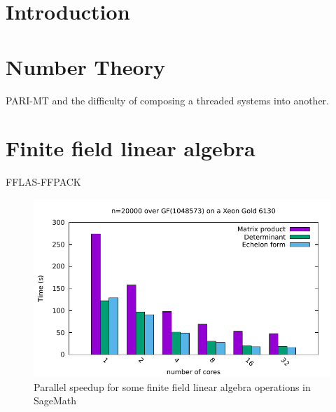 \documentclass{deliverablereport}
\author{Author names}
\begin{document}
\maketitle
\githubissuedescription



\section{Introduction}

\section{Number Theory}

PARI-MT and the difficulty of composing a threaded systems into another.

\section{Finite field linear algebra}
FFLAS-FFPACK

\begin{figure}
  \begin{center}
    \includegraphics[width=.6\textwidth]{Pictures/histo_dahu61}
    \caption{Parallel speedup for some finite field linear algebra operations in SageMath}
  \end{center}
\end{figure}
\end{document}
